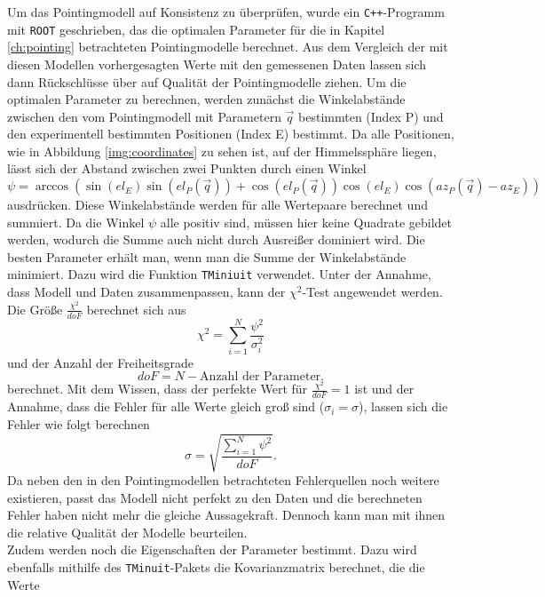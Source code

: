 Um das Pointingmodell auf Konsistenz zu überprüfen, wurde ein \texttt{C++}-Programm mit \texttt{ROOT} geschrieben, das die optimalen Parameter für die in Kapitel \ref{ch:pointing} betrachteten Pointingmodelle berechnet. Aus dem Vergleich der mit diesen Modellen vorhergesagten Werte mit den gemessenen Daten lassen sich dann Rückschlüsse über auf Qualität der Pointingmodelle ziehen. Um die optimalen Parameter zu berechnen, werden zunächst die Winkelabstände zwischen den vom Pointingmodell mit Parametern $\vec{q}$ bestimmten (Index P) und den experimentell bestimmten Positionen (Index E) bestimmt. Da alle Positionen, wie in Abbildung \ref{img:coordinates} zu sehen ist, auf der Himmelssphäre liegen, lässt sich der Abstand zwischen zwei Punkten durch einen Winkel 
\begin{equation}
\psi=\arccos\left(\sin(el_E)\sin(el_P(\vec{q}))+\cos(el_P(\vec{q}))\cos(el_E)\cos(az_P(\vec{q})-az_E)\right)
\end{equation}
ausdrücken. Diese Winkelabstände werden für alle Wertepaare berechnet und summiert. Da die Winkel $\psi$ alle positiv sind, müssen hier keine Quadrate gebildet werden, wodurch die Summe auch nicht durch Ausreißer dominiert wird. Die besten Parameter erhält man, wenn man die Summe der Winkelabstände minimiert. Dazu wird die Funktion \texttt{TMiniuit} verwendet. Unter der Annahme, dass Modell und Daten zusammenpassen, kann der $\chi^2$-Test angewendet werden. Die Größe $\frac{\chi^2}{doF}$ berechnet sich aus 
\begin{equation}
\chi^2=\sum^N_{i=1}\frac{\psi^2}{\sigma_i^2}
\end{equation}
und der Anzahl der Freiheitsgrade
\begin{equation}
doF=N-\textrm{Anzahl der Parameter}.
\end{equation}
berechnet. Mit dem Wissen, dass der perfekte Wert für $\frac{\chi^2}{doF}=1$ ist und der Annahme, dass die Fehler für alle Werte gleich groß sind ($\sigma_i=\sigma$), lassen sich die Fehler wie folgt berechnen
\begin{equation}
\sigma=\sqrt{\frac{\sum^N_{i=1}\psi^2}{doF}}.
\end{equation}
Da neben den in den Pointingmodellen betrachteten Fehlerquellen noch weitere existieren, passt das Modell nicht perfekt zu den Daten und die berechneten Fehler haben nicht mehr die gleiche Aussagekraft. Dennoch kann man mit ihnen die relative Qualität der Modelle beurteilen.\\
Zudem werden noch die Eigenschaften der Parameter bestimmt. Dazu wird ebenfalls mithilfe des \texttt{TMinuit}-Pakets die Kovarianzmatrix berechnet, die die Werte
